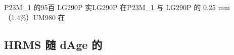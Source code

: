 \documentclass[11pt,a4paper]{article}
\numberwithin{equation}{section}
\numberwithin{figure}{section}
\begin{document}
P23M\_1 {\cjkfont 的}\allowbreak{}95{\cjkfont 百}\allowbreak{} LG290P {\cjkfont 实}\allowbreak{}LG290P {\cjkfont 在}\allowbreak{}P23M\_1 {\cjkfont 与}\allowbreak{} LG290P {\cjkfont 的}\allowbreak{} 0.25 mm{\cjkfont （}\allowbreak{}1.4\%{\cjkfont ）}\allowbreak{}UM980 {\cjkfont 在}\allowbreak{}

\subsection{HRMS {\cjkfont 随}\allowbreak{} dAge {\cjkfont 的}\allowbreak{}}
\end{document}
